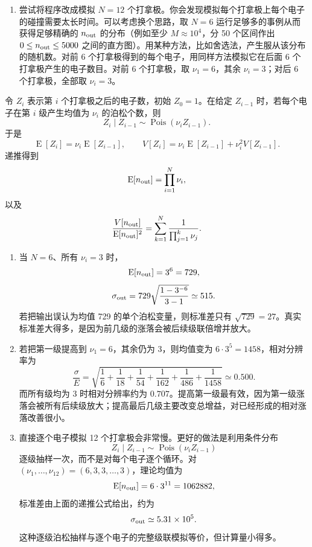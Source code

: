 \begin{question}
\begin{enumerate}
\item 尝试将程序改成模拟 \(N=12\)
个打拿极。你会发现模拟每个打拿极上每个电子的碰撞需要太长时间。可以考虑换个思路，取
\(N=6\) 运行足够多的事例从而获得足够精确的 \(n_{\rm out}\)
的分布（例如至少 \(M\approx10^4\)，分 50 个区间作出
\(0\le n_{\rm out}\le5000\)
之间的直方图）。用某种方法，比如舍选法，产生服从该分布的随机数。对前 6
个打拿极得到的每个电子，用同样方法模拟它在后面 6
个打拿极产生的电子数目。对前 6 个打拿极，取 \(\nu_1=6\)，其余
\(\nu_i=3\)；对后 6 个打拿极，全部取 \(\nu_i=3\)。
\end{enumerate}
\begin{solution}
令 \(Z_i\) 表示第 \(i\) 个打拿极之后的电子数，初始 \(Z_0=1\)。在给定
\(Z_{i-1}\) 时，若每个电子在第 \(i\) 级产生均值为 \(\nu_i\) 的泊松个数，则
\[
Z_i\mid Z_{i-1}\sim\operatorname{Pois}(\nu_i Z_{i-1}).
\]
于是
\[
\operatorname{E}[Z_i]=\nu_i\operatorname{E}[Z_{i-1}],
\qquad
V[Z_i]=\nu_i\operatorname{E}[Z_{i-1}]+\nu_i^2V[Z_{i-1}].
\]
递推得到
\[
\operatorname{E}[n_{\rm out}]=\prod_{i=1}^N\nu_i,
\]
以及
\[
\frac{V[n_{\rm out}]}{\operatorname{E}[n_{\rm out}]^2}
=\sum_{k=1}^N\frac{1}{\prod_{j=1}^k\nu_j}.
\]
\begin{enumerate}
\item 当 \(N=6\)、所有 \(\nu_i=3\) 时，
\[
\operatorname{E}[n_{\rm out}]=3^6=729,
\]
\[
\sigma_{\rm out}=729\sqrt{\frac{1-3^{-6}}{3-1}}\simeq515.
\]
若把输出误认为均值 729 的单个泊松变量，则标准差只有 \(\sqrt{729}=27\)。真实标准差大得多，是因为前几级的涨落会被后续级联倍增并放大。

\item 若把第一级提高到 \(\nu_1=6\)，其余仍为 3，则均值变为
\(6\cdot3^5=1458\)，相对分辨率为
\[
\frac{\sigma}{E}
=\sqrt{\frac16+\frac1{18}+\frac1{54}+\frac1{162}+\frac1{486}+\frac1{1458}}
\simeq0.500.
\]
而所有级均为 3 时相对分辨率约为 \(0.707\)。提高第一级最有效，因为第一级涨落会被所有后续级放大；提高最后几级主要改变总增益，对已经形成的相对涨落改善很小。

\item 直接逐个电子模拟 12 个打拿极会非常慢。更好的做法是利用条件分布
\[
Z_i\mid Z_{i-1}\sim\operatorname{Pois}(\nu_i Z_{i-1})
\]
逐级抽样一次，而不是对每个电子逐个循环。对
\((\nu_1,\ldots,\nu_{12})=(6,3,3,\ldots,3)\)，理论均值为
\[
\operatorname{E}[n_{\rm out}]=6\cdot3^{11}=1062882,
\]
标准差由上面的递推公式给出，约为
\[
\sigma_{\rm out}\simeq5.31\times10^5.
\]
这种逐级泊松抽样与逐个电子的完整级联模拟等价，但计算量小得多。
\end{enumerate}
\end{solution}
\end{question}

